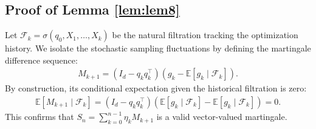 \documentclass[11pt,a4paper]{article}
\theoremstyle{definition}
\begin{document}
\subsection{Proof of Lemma \ref{lem:lem8}}
Let $\mathcal{F}_k = \sigma(q_0, X_1, \dots, X_k)$ be the natural filtration tracking the optimization history. We isolate the stochastic sampling fluctuations by defining the martingale difference sequence:
\begin{align}
M_{k+1} = (I_d - q_k q_k^\top) \left( g_k - \mathbb{E}[g_k \mid \mathcal{F}_k] \right).
\end{align}
By construction, its conditional expectation given the historical filtration is zero:
\begin{align}
\mathbb{E}[M_{k+1} \mid \mathcal{F}_k] = (I_d - q_k q_k^\top) \left( \mathbb{E}[g_k \mid \mathcal{F}_k] - \mathbb{E}[g_k \mid \mathcal{F}_k] \right) = 0.
\end{align}
This confirms that $S_n = \sum_{k=0}^{n-1} \eta_k M_{k+1}$ is a valid vector-valued martingale.
\end{document}
